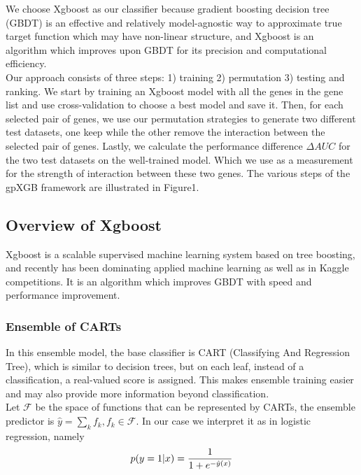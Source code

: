 \documentclass[11pt]{article}
\theoremstyle{plain}
\theoremstyle{definition}
\theoremstyle{remark}
\begin{document}
We choose Xgboost as our classifier because gradient boosting decision tree (GBDT) is an effective and relatively model-agnostic way to approximate true target function which may have non-linear structure, and Xgboost is an algorithm which improves upon GBDT for its precision and computational efficiency.\\

Our approach consists of three steps: 1) training 2) permutation 3) testing and ranking. We start by training an Xgboost model with all the genes in the gene list and use cross-validation to choose a best model and save it. Then, for each selected pair of genes, we use our permutation strategies to generate two different test datasets, one keep while the other remove the interaction between the selected pair of genes. Lastly, we calculate the performance difference $\Delta AUC$ for the two test datasets on the well-trained model. Which we use as a measurement for the strength of interaction between these two genes. The various steps of the gpXGB framework are illustrated in Figure1.

\subsection{Overview of Xgboost}

Xgboost \cite{9} is a scalable supervised machine learning system based on tree boosting, and recently has been dominating applied machine learning as well as in Kaggle competitions. It is an algorithm which improves GBDT with speed and performance improvement.

\subsubsection{Ensemble of CARTs}
In this ensemble model, the base classifier is CART (Classifying And Regression Tree), which is similar to decision trees, but on each leaf, instead of a classification, a real-valued score is assigned. This makes ensemble training easier and may also provide more information beyond classification.\\

Let $\mathcal{F}$ be the space of functions that can be represented by CARTs, the ensemble predictor is $\hat{y}=\sum_k f_k, f_k\in\mathcal{F}$. In our case we interpret it as in logistic regression, namely
\begin{equation}
p(y=1|x)={1\over 1+e^{-\hat{y}(x)}}
\end{equation}
\end{document}
